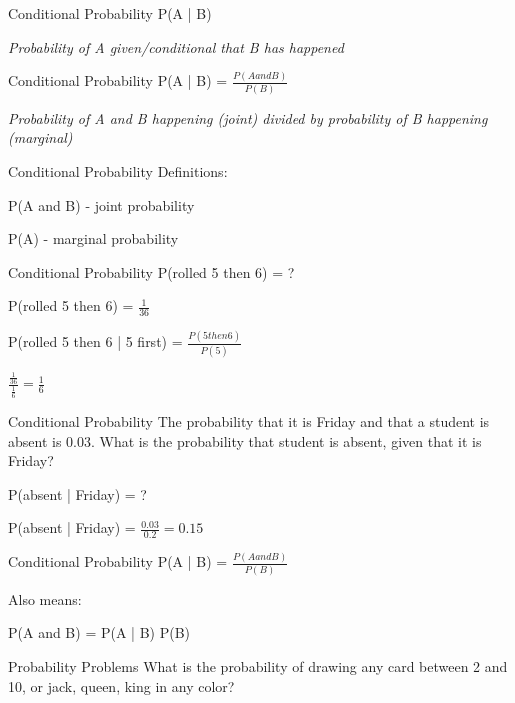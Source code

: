 \documentclass[presentation]{beamer}
\begin{document}
\begin{frame}[label={sec:orgcb5ed55}]{Conditional Probability}
P(A | B)

\emph{Probability of A given/conditional that B has happened}
\end{frame}

\begin{frame}[label={sec:org0cbece0}]{Conditional Probability}
P(A | B) = \(\frac{P(A and B)}{P(B)}\)


\emph{Probability of A and B happening (joint)  divided by probability of B happening (marginal)}
\end{frame}

\begin{frame}[label={sec:org592ef07}]{Conditional Probability}
Definitions:

P(A and B) - joint probability

P(A) - marginal probability
\end{frame}


\begin{frame}[label={sec:orgd7d7e54}]{Conditional Probability}
P(rolled 5 then 6) = ?

\pause

P(rolled 5 then 6) = \(\frac{1}{36}\)

P(rolled 5 then 6 | 5 first) =  \(\frac{P(5 then 6)}{P(5)}\)

\pause


\(\frac{\frac{1}{36}}{\frac{1}{6}} = \frac{1}{6}\)
\end{frame}


\begin{frame}[label={sec:orgdcc7201}]{Conditional Probability}
The probability that it is Friday and that a student is absent is 0.03. What is the probability that student is absent, given that it is Friday?

P(absent | Friday) = ?

\pause

P(absent | Friday) = \(\frac{0.03}{0.2} = 0.15\)
\end{frame}


\begin{frame}[label={sec:orgde5b536}]{Conditional Probability}
P(A | B) = \(\frac{P(A and B)}{P(B)}\)


Also means:

P(A and B) = P(A | B) P(B)
\end{frame}



\begin{frame}[label={sec:org8470792}]{Probability Problems}
What is the probability of drawing any card between 2 and
10, or jack, queen, king in any color?
\end{frame}
\end{document}
